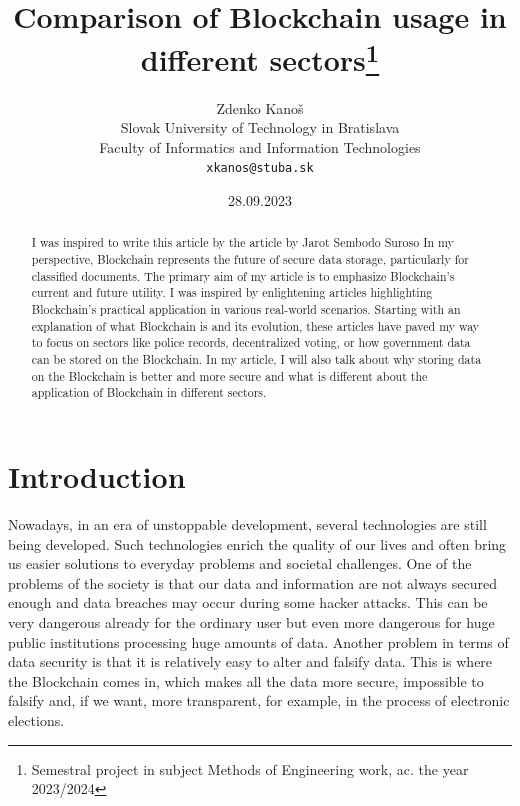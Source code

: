 \documentclass[10pt,english,a4paper]{article}
\title{Comparison of Blockchain usage in different sectors\centering\thanks{Semestral project in subject Methods of Engineering work, ac. the year 2023/2024}}
\author{Zdenko Kanoš\\[2pt]
	{\small Slovak University of Technology in Bratislava}\\
	{\small Faculty of Informatics and Information Technologies}\\
	{\small \texttt{xkanos@stuba.sk}}
	}
\date{\small 28.09.2023}
\begin{document}
\maketitle

\begin{abstract}
I was inspired to write this article by the article by Jarot Sembodo Suroso\cite{Suroso:SKCK} In my perspective, Blockchain represents the future of secure data storage, particularly for classified documents. The primary aim of my article is to emphasize Blockchain’s current and future utility. I was inspired by enlightening articles highlighting Blockchain's practical application in various real-world scenarios. Starting with an explanation of what Blockchain is and its evolution, these articles have paved my way to focus on sectors like police records, decentralized voting, or how government data can be stored on the Blockchain. In my article, I will also talk about why storing data on the Blockchain is better and more secure and what is different about the application of Blockchain in different sectors.
\end{abstract}

\section{Introduction}
Nowadays, in an era of unstoppable development, several technologies are still being developed. Such technologies enrich the quality of our lives and often bring us easier solutions to everyday problems and societal challenges. One of the problems of the society is that our data and information are not always secured enough and data breaches may occur during some hacker attacks. This can be very dangerous already for the ordinary user but even more dangerous for huge public institutions processing huge amounts of data. Another problem in terms of data security is that it is relatively easy to alter and falsify data.  This is where the Blockchain comes in, which makes all the data more secure, impossible to falsify and, if we want, more transparent, for example, in the process of electronic elections.
\newpage
\end{document}
